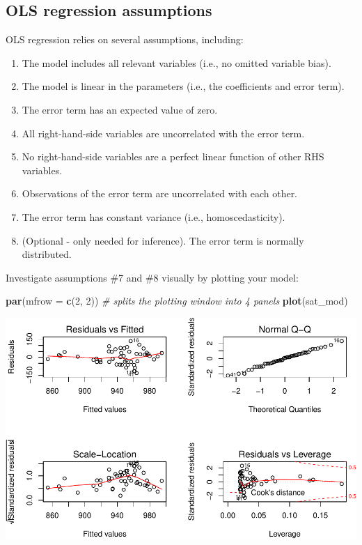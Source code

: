 \documentclass[]{book}
\newenvironment{Shaded}{\begin{snugshade}}{\end{snugshade}}
\newcommand{\CommentTok}[1]{\textcolor[rgb]{0.56,0.35,0.01}{\textit{#1}}}
\newcommand{\DataTypeTok}[1]{\textcolor[rgb]{0.13,0.29,0.53}{#1}}
\newcommand{\DecValTok}[1]{\textcolor[rgb]{0.00,0.00,0.81}{#1}}
\newcommand{\KeywordTok}[1]{\textcolor[rgb]{0.13,0.29,0.53}{\textbf{#1}}}
\newcommand{\NormalTok}[1]{#1}
\providecommand{\tightlist}{%
  \setlength{\itemsep}{0pt}\setlength{\parskip}{0pt}}
\begin{document}
\hypertarget{ols-regression-assumptions}{%
\subsection{OLS regression assumptions}\label{ols-regression-assumptions}}

OLS regression relies on several assumptions, including:

\begin{enumerate}
\def\labelenumi{\arabic{enumi}.}
\tightlist
\item
  The model includes all relevant variables (i.e., no omitted variable bias).
\item
  The model is linear in the parameters (i.e., the coefficients and error term).
\item
  The error term has an expected value of zero.
\item
  All right-hand-side variables are uncorrelated with the error term.
\item
  No right-hand-side variables are a perfect linear function of other RHS variables.
\item
  Observations of the error term are uncorrelated with each other.
\item
  The error term has constant variance (i.e., homoscedasticity).
\item
  (Optional - only needed for inference). The error term is normally distributed.
\end{enumerate}

Investigate assumptions \#7 and \#8 visually by plotting your model:

\begin{Shaded}
\begin{Highlighting}[]
  \KeywordTok{par}\NormalTok{(}\DataTypeTok{mfrow =} \KeywordTok{c}\NormalTok{(}\DecValTok{2}\NormalTok{, }\DecValTok{2}\NormalTok{)) }\CommentTok{# splits the plotting window into 4 panels}
  \KeywordTok{plot}\NormalTok{(sat_mod)}
\end{Highlighting}
\end{Shaded}

\includegraphics{R/Rmodels/figures/unnamed-chunk-91-1.pdf}
\end{document}
